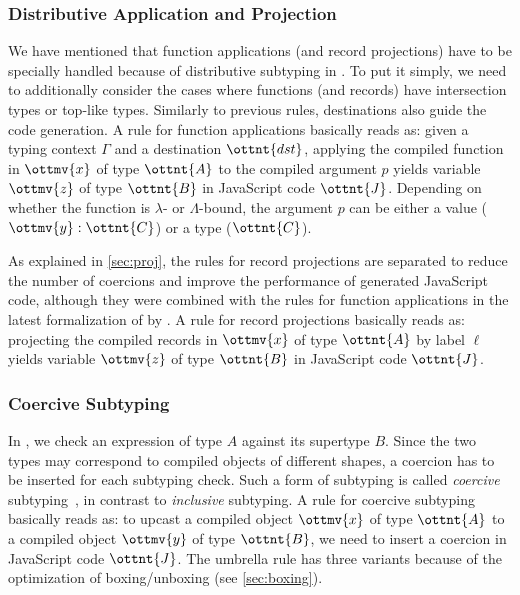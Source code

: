 {\small\ottdefncompile{}}

\subsubsection{Distributive Application and Projection}

We have mentioned that function applications (and record projections) have to be
specially handled because of distributive subtyping in \fiplus. To put it
simply, we need to additionally consider the cases where functions (and records)
have intersection types or top-like types. Similarly to previous rules,
destinations also guide the code generation. A rule for function applications
basically reads as: given a typing context $\Gamma$ and a destination
$\ottnt{dst}$, applying the compiled function in $\ottmv{x}$ of type $\ottnt{A}$ to
the compiled argument $p$ yields variable $\ottmv{z}$ of type $\ottnt{B}$ in
JavaScript code $\ottnt{J}$. Depending on whether the function is $\lambda$- or
$\Lambda$-bound, the argument $p$ can be either a value ($\ottmv{y} : \ottnt{C}$) or
a type ($\ottnt{C}$).

{\small\ottdefndapp{}}

\noindent
As explained in \autoref{sec:proj}, the rules for record projections are
separated to reduce the number of coercions and improve the performance of
generated JavaScript code, although they were combined with the rules for
function applications in the latest formalization of \fiplus by
\citet{fan2022direct}. A rule for record projections basically reads as:
projecting the compiled records in $\ottmv{x}$ of type $\ottnt{A}$ by label $\ell$
yields variable $\ottmv{z}$ of type $\ottnt{B}$ in JavaScript code $\ottnt{J}$.

{\small\ottdefndproj{}}

\subsubsection{Coercive Subtyping}

In , we check an expression of type $A$ against its supertype $B$.
Since the two types may correspond to compiled objects of different shapes, a
coercion has to be inserted for each subtyping check. Such a form of subtyping
is called \emph{coercive} subtyping~\citep{luo2013coercive}, in contrast to
\emph{inclusive} subtyping. A rule for coercive subtyping basically reads as: to
upcast a compiled object $\ottmv{x}$ of type $\ottnt{A}$ to a compiled object
$\ottmv{y}$ of type $\ottnt{B}$, we need to insert a coercion in JavaScript code
$\ottnt{J}$. The umbrella rule has three variants because of the optimization of
boxing/unboxing (see \autoref{sec:boxing}).

